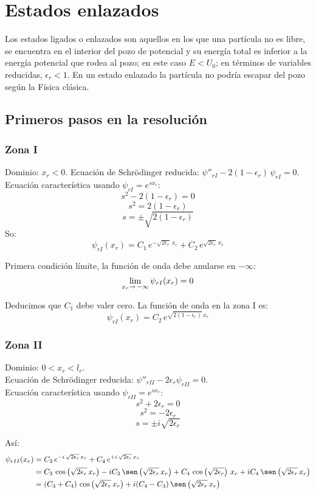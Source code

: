 
\section{Estados enlazados}
Los estados ligados o enlazados son aquellos en los que una partícula
no es libre, se encuentra en el interior del pozo de potencial y su energía
total es inferior a la energía potencial que rodea al pozo; en este caso
$E<U_0$; en términos de variables reducidas, $\epsilon_r < 1$.
En un estado enlazado la partícula no podría escapar del pozo según la Física
clásica.

\subsection{Primeros pasos en la resolución}
\subsubsection{Zona I}
\noindent
Dominio: $x_r < 0$.
Ecuación de Schrödinger reducida:
$\psi''_{rI} - 2(1-\epsilon_r)\,\psi_{rI} = 0$.
Ecuación característica usando $\psi_{rI}=e^{sx_r}$:
\[
s^2-2(1-\epsilon_r)=0
\]
\[
s^2=2(1-\epsilon_r)
\]
\[
s = \pm\sqrt{2(1-\epsilon_r)}
\]
So:
\[
\psi_{rI}(x_r)
 = C_1\,e^{-\sqrt{2\epsilon_r}\,x_r} + C_2\,e^{\sqrt{2\epsilon_r}\,x_r}
\]

Primera condición límite, la función de onda debe anularse en $-\infty$:
\[
\lim_{\scriptsize x_r\to\, -\infty} \psi_{rI}(x_r) = 0
\]

Deducimos que $C_1$ debe valer cero. La función de onda en la zona I es:
\[
\psi_{rI}(x_r) = C_2\,e^{\sqrt{2(1-\epsilon_r)}\,x_r}
\]

\subsubsection{Zona II}
\noindent
Dominio: $0 < x_r < l_r$.\\
Ecuación de Schrödinger reducida: $\psi''_{rII} - 2\epsilon_r\psi_{rII}= 0$.\\
Ecuación característica usando $\psi_{rII}=e^{sx_r}$:
\[
s^2+2\epsilon_r=0
\]
\[
s^2=-2\epsilon_r
\]
\[
s = \pm i\sqrt{2\epsilon_r}
\]

Así:
\begin{align*}
\psi_{rII}(x_r)
&=C_3\,e^{-i\,\sqrt{2\epsilon_r}\,x_r} + C_4\,e^{+i\,\sqrt{2\epsilon_r}\,x_r}\\
&=C_3\,\cos\left(\sqrt{2\epsilon_r}\,x_r\right)
 - i C_3\,\sen\left(\sqrt{2\epsilon_r}\,x_r\right)
 + C_4\,\cos\left(\sqrt{2\epsilon_r}\right)\,x_r 
 + i C_4\,\sen\left(\sqrt{2\epsilon_r}\,x_r\right)\\
&=(C_3+C_4)\,\cos\left(\sqrt{2\epsilon_r}\,x_r\right)
 + i (C_4-C_3)\,\sen\left(\sqrt{2\epsilon_r}\,x_r\right)
\end{align*}

